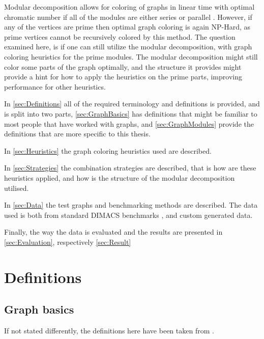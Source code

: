 \documentclass[a4paper]{article}
\begin{document}
Modular decomposition allows for coloring of graphs in linear time with optimal
chromatic number if all of the modules are either  series or
parallel \cite{HCL}. However, if any of the vertices are prime then optimal graph coloring 
is again NP-Hard\cite{NPHard}, as prime vertices cannot be recursively colored by this
method. The question examined here, is if one can still utilize the
modular decomposition, with graph coloring heuristics for the prime modules.
The modular decomposition might still color some parts of the graph optimally,
and the structure it provides might provide a hint for how to apply the
heuristics on the prime parts, improving performance for other heuristics.

In \autoref{sec:Definitions} all of the required terminology and definitions is
provided, and is split into two parts, \autoref{sec:GraphBasics} has definitions that might be
familiar to most people that have worked with graphs, and
\autoref{sec:GraphModules} provide the definitions that are more specific to
this thesis.

In \autoref{sec:Heuristics} the graph coloring heuristics used are described.

In \autoref{sec:Strategies} the combination strategies are described, that is how are
these heuristics applied, and how is the structure of the modular decomposition
utilised.

In \autoref{sec:Data} the test graphs and benchmarking methods are described. The data
used is both from standard DIMACS benchmarks \cite{DIMACS}, and custom generated data.

Finally, the way the data is evaluated and the results are presented in 
\autoref{sec:Evaluation}, respectively \autoref{sec:Result}

\section{Definitions}
\label{sec:Definitions}

\subsection{Graph basics}
\label{sec:GraphBasics}

If not stated differently, the definitions here have been taken from 
\cite{GraphBasics}.
\end{document}
